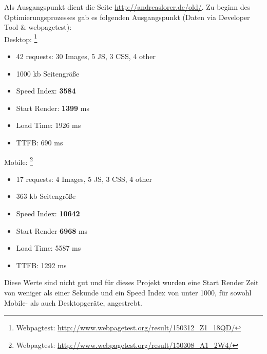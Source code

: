 		Als Ausgangspunkt dient die Seite \url{http://andreaslorer.de/old/}. Zu beginn des Optimierungsprozesses gab es folgenden Ausgangspunkt (Daten via Developer Tool \& webpagetest):\\

		Desktop: \footnote{Webpagtest: \url{http://www.webpagetest.org/result/150312_Z1_18QD/}}
		\begin{itemize}
			\item 42 requests: 30 Images, 5 JS, 3 CSS, 4 other
			\item 1000 kb Seitengröße
			\item Speed Index: \textbf{3584}
			\item Start Render: \textbf{1399}  ms
			\item Load Time: 1926 ms
			\item TTFB: 690 ms
		\end{itemize}

		Mobile: \footnote{Webpagtest: \url{http://www.webpagetest.org/result/150308_A1_2W4/}}
		\begin{itemize}
			\item 17 requests: 4 Images, 5 JS, 3 CSS, 4 other
			\item 363 kb Seitengröße
			\item Speed Index: \textbf{10642}
			\item Start Render \textbf{6968} ms
			\item Load Time: 5587 ms
			\item TTFB: 1292 ms
		\end{itemize}

		Diese Werte sind nicht gut und für dieses Projekt wurden eine Start Render Zeit von weniger als einer Sekunde und ein Speed Index von unter 1000, für sowohl Mobile- als auch Desktopgeräte, angestrebt.\\

